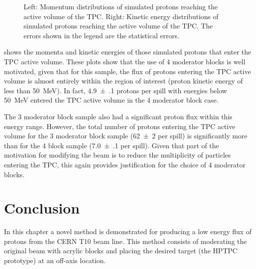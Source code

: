 \begin{figure}[h]
  \begin{minipage}[t]{.5\textwidth}
    \begin{adjustbox}{max totalsize=\textwidth, center}
      
    \end{adjustbox}
  \end{minipage}
  \hfill
  \begin{minipage}[t]{.5\textwidth}
    \begin{adjustbox}{max totalsize=\textwidth, center}
      
    \end{adjustbox}    
  \end{minipage}
  \caption[Momentum and kinetic energy distributions of simulated protons reaching the active volume of the TPC]{Left: Momentum distributions of simulated protons reaching the active volume of the TPC. Right: Kinetic energy distributions of simulated protons reaching the active volume of the TPC. The errors shown in the legend are the statistical errors.}
  \label{fig:protonTpcSim}
\end{figure}

 shows the momenta and kinetic energies of those simulated protons that enter the TPC active volume.
These plots show that the use of 4 moderator blocks is well motivated, given that for this sample, the flux of protons entering the TPC active volume is almost entirely within the region of interest (proton kinetic energy of less than \SI{50}{\mega\electronvolt}).
In fact, \num{4.9(1)} protons per spill with energies below \SI{50}{\mega\electronvolt} entered the TPC active volume in the 4 moderator block case.

The 3 moderator block sample also had a significant proton flux within this energy range.
However, the total number of protons entering the TPC active volume for the 3 moderator block sample (\num{62(2)} per spill) is significantly more than for the 4 block sample (\num{7.0(1)} per spill).
Given that part of the motivation for modifying the beam is to reduce the multiplicity of particles entering the TPC, this again provides justification for the choice of 4 moderator blocks.

\section{Conclusion}

In this chapter a novel method is demonstrated for producing a low energy flux of protons from the CERN T10 beam line.
This method consists of moderating the original beam with acrylic blocks and placing the desired target (the HPTPC prototype) at an off-axis location.

